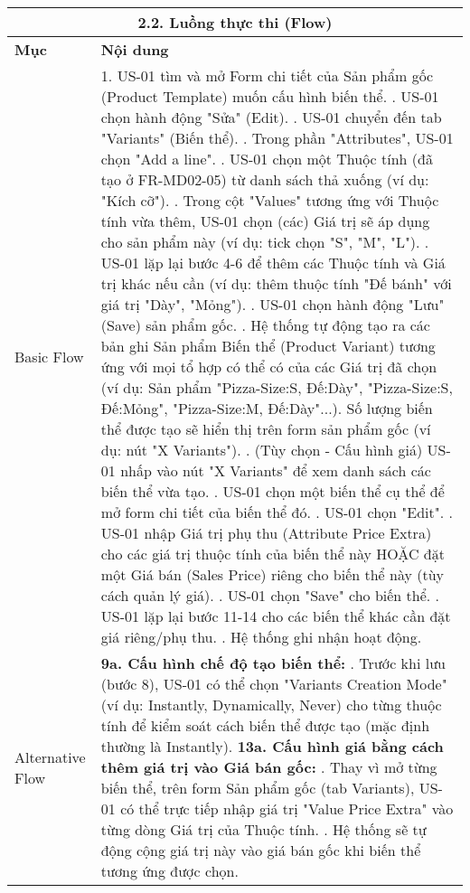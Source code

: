 \begin{longtable}{|m{4cm}|p{11cm}|}
\hline
\multicolumn{2}{|c|}{\textbf{2.2. Luồng thực thi (Flow)}} \\
\hline
\textbf{Mục} & \textbf{Nội dung} \\
\hline
Basic Flow & 1. US-01 tìm và mở Form chi tiết của Sản phẩm gốc (Product Template) muốn cấu hình biến thể. \newline 2. US-01 chọn hành động "Sửa" (Edit). \newline 3. US-01 chuyển đến tab "Variants" (Biến thể). \newline 4. Trong phần "Attributes", US-01 chọn "Add a line". \newline 5. US-01 chọn một Thuộc tính (đã tạo ở FR-MD02-05) từ danh sách thả xuống (ví dụ: "Kích cỡ"). \newline 6. Trong cột "Values" tương ứng với Thuộc tính vừa thêm, US-01 chọn (các) Giá trị sẽ áp dụng cho sản phẩm này (ví dụ: tick chọn "S", "M", "L"). \newline 7. US-01 lặp lại bước 4-6 để thêm các Thuộc tính và Giá trị khác nếu cần (ví dụ: thêm thuộc tính "Đế bánh" với giá trị "Dày", "Mỏng"). \newline 8. US-01 chọn hành động "Lưu" (Save) sản phẩm gốc. \newline 9. Hệ thống tự động tạo ra các bản ghi Sản phẩm Biến thể (Product Variant) tương ứng với mọi tổ hợp có thể có của các Giá trị đã chọn (ví dụ: Sản phẩm "Pizza-Size:S, Đế:Dày", "Pizza-Size:S, Đế:Mỏng", "Pizza-Size:M, Đế:Dày"...). Số lượng biến thể được tạo sẽ hiển thị trên form sản phẩm gốc (ví dụ: nút "X Variants"). \newline 10. (Tùy chọn - Cấu hình giá) US-01 nhấp vào nút "X Variants" để xem danh sách các biến thể vừa tạo. \newline 11. US-01 chọn một biến thể cụ thể để mở form chi tiết của biến thể đó. \newline 12. US-01 chọn "Edit". \newline 13. US-01 nhập Giá trị phụ thu (Attribute Price Extra) cho các giá trị thuộc tính của biến thể này HOẶC đặt một Giá bán (Sales Price) riêng cho biến thể này (tùy cách quản lý giá). \newline 14. US-01 chọn "Save" cho biến thể. \newline 15. US-01 lặp lại bước 11-14 cho các biến thể khác cần đặt giá riêng/phụ thu. \newline 16. Hệ thống ghi nhận hoạt động. \\
\hline
Alternative Flow & \textbf{9a. Cấu hình chế độ tạo biến thể:} \newline    1. Trước khi lưu (bước 8), US-01 có thể chọn "Variants Creation Mode" (ví dụ: Instantly, Dynamically, Never) cho từng thuộc tính để kiểm soát cách biến thể được tạo (mặc định thường là Instantly). \newline \textbf{13a. Cấu hình giá bằng cách thêm giá trị vào Giá bán gốc:} \newline    1. Thay vì mở từng biến thể, trên form Sản phẩm gốc (tab Variants), US-01 có thể trực tiếp nhập giá trị "Value Price Extra" vào từng dòng Giá trị của Thuộc tính. \newline    2. Hệ thống sẽ tự động cộng giá trị này vào giá bán gốc khi biến thể tương ứng được chọn. \\

\end{longtable}
